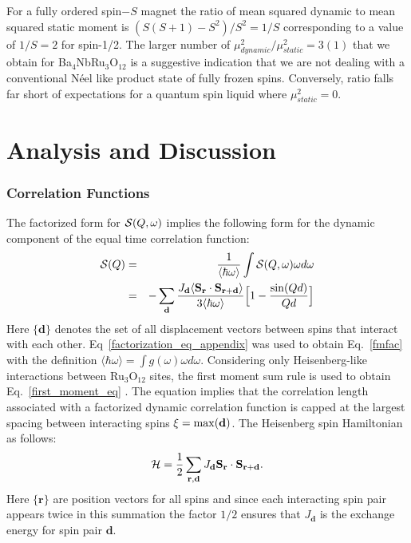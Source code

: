 \documentclass[%
 reprint,
superscriptaddress,
 amsmath,amssymb,
 aps,
 prb,
]{revtex4-2}
\begin{document}
For a fully ordered spin$-S$ magnet the ratio of mean squared dynamic to mean squared static moment is $(S(S+1)-S^2)/S^2=1/S$ corresponding to a value of $1/S=2$ for spin-1/2. The larger number of $\mu_{dynamic}^2/\mu_{static}^2=3(1)$ that we obtain for Ba$_4$NbRu$_3$O$_{12}$ is a suggestive indication that we are not dealing with a conventional Néel like product state of fully frozen spins. Conversely, ratio falls far short of expectations for a quantum spin liquid where  $\mu_{static}^2=0$.  

\section{Analysis and Discussion}

\subsubsection{Correlation Functions}

The factorized form for ${\cal S}(Q,\omega)$ implies the following form for the dynamic component of the equal time correlation function:
\begin{eqnarray}
{\cal S}(Q)&=& \frac{1}{\langle \hbar\omega\rangle}\int {\cal S}(Q,\omega)\omega d\omega \label{fmfac}\\ 
&=&-\sum_{\textbf{d}} \frac{J_\textbf{d}
\langle \textbf{S}_\textbf{r}\cdot\textbf{S}_{\textbf{r}+\textbf{d}}\rangle}{3\langle \hbar\omega\rangle} \Big[1 - \frac{\sin(Qd)}{Qd}\Big]
\label{first_moment_eq}
\end{eqnarray}
Here $\{ \textbf{d}\}$ denotes the set of all displacement vectors between spins that interact with each other. Eq~\ref{factorization_eq_appendix} was used to obtain Eq.~\ref{fmfac} with the definition $\langle \hbar\omega\rangle=\int g(\omega) \omega d\omega$.  Considering only Heisenberg-like interactions between Ru$_3$O$_{12}$ sites, the first moment sum rule is used to obtain Eq.~\ref{first_moment_eq} \cite{Hohenberg1974,zaliznyak2005magnetic}. The equation implies that the correlation length associated with a factorized dynamic correlation function is capped at the largest spacing between interacting spins $\xi={\rm max}({\textbf{d}})$. The Heisenberg spin Hamiltonian as follows: 
\begin{equation}
    {\cal H}=\frac{1}{2}\sum_{\textbf{r},\textbf{d}} J_\textbf{d} \textbf{S}_\textbf{r}\cdot \textbf{S}_{\textbf{r}+\textbf{d}}.
    \label{eq:hamiltonian}
\end{equation}
Here  $\{ \textbf{r}\}$ are position vectors for all spins and since each interacting spin pair appears twice in this summation the factor $1/2$ ensures that $J_\textbf{d}$ is the exchange energy for spin pair $\textbf{d}$. 
\end{document}
